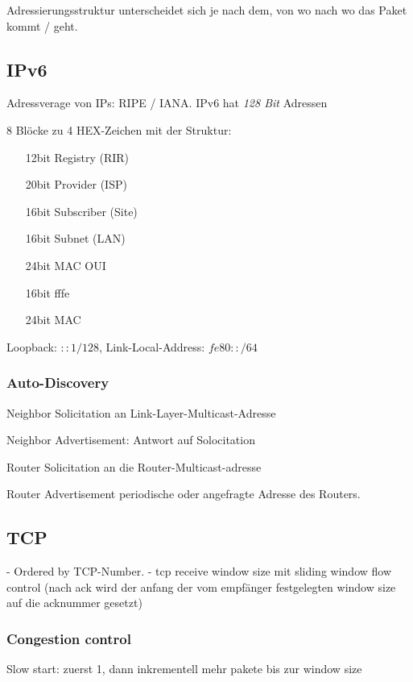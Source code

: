 \begin{multicols}{2}
		Adressierungsstruktur unterscheidet sich je nach dem, von wo nach wo das Paket kommt / geht.
		
		\subsection{IPv6}
			Adressverage von IPs: RIPE / IANA. IPv6 hat \emph{128 Bit} Adressen

			8 Blöcke zu 4 HEX-Zeichen mit der Struktur:
			\begin{itemize}
				\item[12bit] Registry (RIR)
				\item[20bit] Provider (ISP)
				\item[16bit] Subscriber (Site)
				\item[16bit] Subnet (LAN)
				\item[24bit] MAC OUI
				\item[16bit] fffe
				\item[24bit] MAC
			\end{itemize}
			
			Loopback: $::1/128$, Link-Local-Address: $fe80::/64$
			
			\subsubsection{Auto-Discovery}
			
			Neighbor Solicitation an Link-Layer-Multicast-Adresse
			
			Neighbor Advertisement: Antwort auf Solocitation
			
			Router Solicitation an die Router-Multicast-adresse
			
			Router Advertisement periodische oder angefragte Adresse des Routers.
			
\subsection{TCP}
	- Ordered by TCP-Number.
	- tcp receive window size mit sliding window flow control (nach ack wird der anfang der vom empfänger festgelegten window size auf die acknummer gesetzt)
	\subsubsection{Congestion control}
		Slow start: zuerst 1, dann inkrementell mehr pakete bis zur window size
		
		

\end{multicols}


